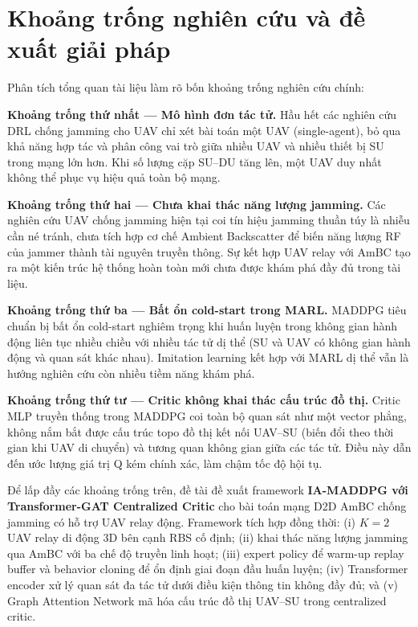 \section{Khoảng trống nghiên cứu và đề xuất giải pháp}
\label{sec:intro:gap}

Phân tích tổng quan tài liệu làm rõ bốn khoảng trống nghiên cứu chính:

\textbf{Khoảng trống thứ nhất --- Mô hình đơn tác tử.}
Hầu hết các nghiên cứu DRL chống jamming cho UAV \cite{wang2023uavjamming, ma2022rl,
duo2020antijamming3d} chỉ xét bài toán một UAV (single-agent), bỏ qua khả năng hợp tác và
phân công vai trò giữa nhiều UAV và nhiều thiết bị SU trong mạng lớn hơn. Khi số lượng cặp
SU--DU tăng lên, một UAV duy nhất không thể phục vụ hiệu quả toàn bộ mạng.

\textbf{Khoảng trống thứ hai --- Chưa khai thác năng lượng jamming.}
Các nghiên cứu UAV chống jamming hiện tại \cite{wang2023uavjamming, ma2022rl,
duo2020antijamming3d} coi tín hiệu jamming thuần túy là nhiễu cần né tránh, chưa tích hợp
cơ chế Ambient Backscatter để biến năng lượng RF của jammer thành tài nguyên truyền thông.
Sự kết hợp UAV relay với AmBC tạo ra một kiến trúc hệ thống hoàn toàn mới chưa được khám
phá đầy đủ trong tài liệu.

\textbf{Khoảng trống thứ ba --- Bất ổn cold-start trong MARL.}
MADDPG tiêu chuẩn bị bất ổn cold-start nghiêm trọng khi huấn luyện trong không gian hành
động liên tục nhiều chiều với nhiều tác tử dị thể (SU và UAV có không gian hành động và
quan sát khác nhau). Imitation learning kết hợp với MARL dị thể vẫn là hướng nghiên cứu
còn nhiều tiềm năng khám phá.

\textbf{Khoảng trống thứ tư --- Critic không khai thác cấu trúc đồ thị.}
Critic MLP truyền thống trong MADDPG coi toàn bộ quan sát như một vector phẳng, không nắm
bắt được cấu trúc topo đồ thị kết nối UAV--SU (biến đổi theo thời gian khi UAV di chuyển)
và tương quan không gian giữa các tác tử. Điều này dẫn đến ước lượng giá trị Q kém chính
xác, làm chậm tốc độ hội tụ.

Để lấp đầy các khoảng trống trên, đề tài đề xuất framework \textbf{IA-MADDPG với
Transformer-GAT Centralized Critic} cho bài toán mạng D2D AmBC chống jamming có hỗ trợ
UAV relay động. Framework tích hợp đồng thời: (i) $K = 2$ UAV relay di động 3D bên cạnh
RBS cố định; (ii) khai thác năng lượng jamming qua AmBC với ba chế độ truyền linh hoạt;
(iii) expert policy để warm-up replay buffer và behavior cloning để ổn định giai đoạn đầu
huấn luyện; (iv) Transformer encoder xử lý quan sát đa tác tử dưới điều kiện thông tin
không đầy đủ; và (v) Graph Attention Network mã hóa cấu trúc đồ thị UAV--SU trong
centralized critic.

